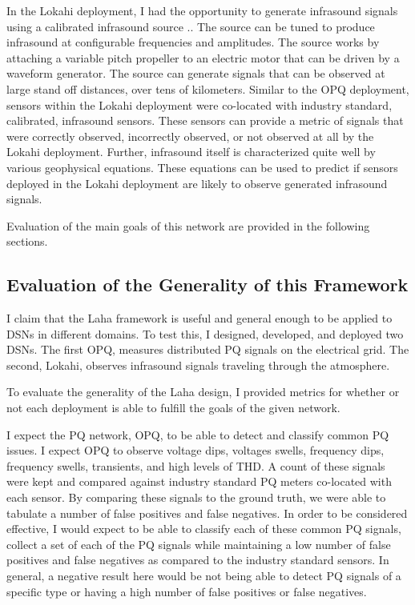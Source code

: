 In the Lokahi deployment, I had the opportunity to generate infrasound signals using a calibrated infrasound source \cite{park2009rotary}.. The source can be tuned to produce infrasound at configurable frequencies and amplitudes. The source works by attaching a variable pitch propeller to an electric motor that can be driven by a waveform generator. The source can generate signals that can be observed at large stand off distances, over tens of kilometers. Similar to the OPQ deployment, sensors within the Lokahi deployment were co-located with industry standard, calibrated, infrasound sensors. These sensors can provide a metric of signals that were correctly observed, incorrectly observed, or not observed at all by the Lokahi deployment. Further, infrasound itself is characterized quite well by various geophysical equations. These equations can be used to predict if sensors deployed in the Lokahi deployment are likely to observe generated infrasound signals.

Evaluation of the main goals of this network are provided in the following sections.

\subsection{Evaluation of the Generality of this Framework}
I claim that the Laha framework is useful and general enough to be applied to DSNs in different domains. To test this, I designed, developed, and deployed two DSNs. The first OPQ, measures distributed PQ signals on the electrical grid. The second, Lokahi, observes infrasound signals traveling through the atmosphere. 

To evaluate the generality of the Laha design, I provided metrics for whether or not each deployment is able to fulfill the goals of the given network.

I expect the PQ network, OPQ, to be able to detect and classify common PQ issues. I expect OPQ to observe voltage dips, voltages swells, frequency dips, frequency swells, transients, and high levels of THD. A count of these signals were kept and compared against industry standard PQ meters co-located with each sensor. By comparing these signals to the ground truth, we were able to tabulate a number of false positives and false negatives. In order to be considered effective, I would expect to be able to classify each of these common PQ signals, collect a set of each of the PQ signals while maintaining a low number of false positives and false negatives as compared to the industry standard sensors. In general, a negative result here would be not being able to detect PQ signals of a specific type or having a high number of false positives or false negatives.

